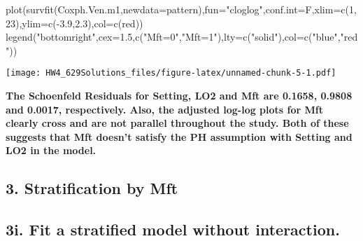 \documentclass[
]{article}
\newenvironment{Shaded}{\begin{snugshade}}{\end{snugshade}}
\newcommand{\AttributeTok}[1]{\textcolor[rgb]{0.77,0.63,0.00}{#1}}
\newcommand{\CommentTok}[1]{\textcolor[rgb]{0.56,0.35,0.01}{\textit{#1}}}
\newcommand{\DecValTok}[1]{\textcolor[rgb]{0.00,0.00,0.81}{#1}}
\newcommand{\FloatTok}[1]{\textcolor[rgb]{0.00,0.00,0.81}{#1}}
\newcommand{\FunctionTok}[1]{\textcolor[rgb]{0.00,0.00,0.00}{#1}}
\newcommand{\NormalTok}[1]{#1}
\newcommand{\OtherTok}[1]{\textcolor[rgb]{0.56,0.35,0.01}{#1}}
\newcommand{\SpecialCharTok}[1]{\textcolor[rgb]{0.00,0.00,0.00}{#1}}
\newcommand{\StringTok}[1]{\textcolor[rgb]{0.31,0.60,0.02}{#1}}
\begin{document}
\begin{Shaded}
\begin{Highlighting}[]
\FunctionTok{plot}\NormalTok{(}\FunctionTok{survfit}\NormalTok{(Coxph.Ven.m1,}\AttributeTok{newdata=}\NormalTok{pattern),}\AttributeTok{fun=}\StringTok{"cloglog"}\NormalTok{,}\AttributeTok{conf.int=}\NormalTok{F,}\AttributeTok{xlim=}\FunctionTok{c}\NormalTok{(}\DecValTok{1}\NormalTok{,}\DecValTok{23}\NormalTok{),}\AttributeTok{ylim=}\FunctionTok{c}\NormalTok{(}\SpecialCharTok{{-}}\FloatTok{3.9}\NormalTok{,}\FloatTok{2.3}\NormalTok{),}\AttributeTok{col=}\FunctionTok{c}\NormalTok{(}\StringTok{\textquotesingle{}red\textquotesingle{}}\NormalTok{))}
\FunctionTok{legend}\NormalTok{(}\StringTok{"bottomright"}\NormalTok{,}\AttributeTok{cex=}\FloatTok{1.5}\NormalTok{,}\FunctionTok{c}\NormalTok{(}\StringTok{"Mft=0"}\NormalTok{,}\StringTok{"Mft=1"}\NormalTok{),}\AttributeTok{lty=}\FunctionTok{c}\NormalTok{(}\StringTok{"solid"}\NormalTok{),}\AttributeTok{col=}\FunctionTok{c}\NormalTok{(}\StringTok{"blue"}\NormalTok{,}\StringTok{"red"}\NormalTok{))}
\end{Highlighting}
\end{Shaded}

\texttt{[image: HW4\_629Solutions\_files/figure-latex/unnamed-chunk-5-1.pdf]}

\textbf{The Schoenfeld Residuals for Setting, LO2 and Mft are 0.1658,
0.9808 and 0.0017, respectively. Also, the adjusted log-log plots for
Mft clearly cross and are not parallel throughout the study. Both of
these suggests that Mft doesn't satisfy the PH assumption with Setting
and LO2 in the model. }

\hypertarget{stratification-by-mft}{%
\subsection{3. Stratification by Mft}\label{stratification-by-mft}}

\hypertarget{i.-fit-a-stratified-model-without-interaction.}{%
\subsection{3i. Fit a stratified model without
interaction.}\label{i.-fit-a-stratified-model-without-interaction.}}

\begin{Shaded}
\end{Shaded}
\end{document}

